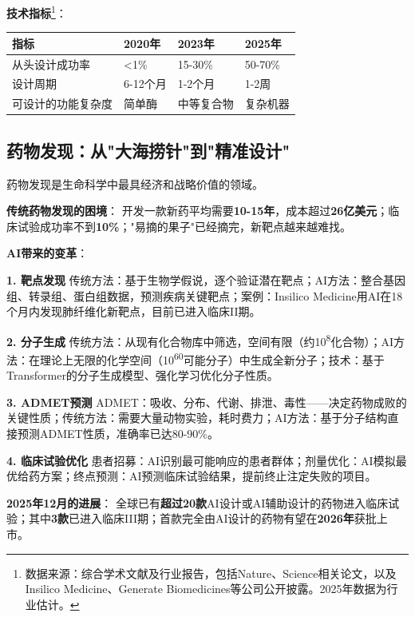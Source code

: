 \textbf{技术指标}\footnote{数据来源：综合学术文献及行业报告，包括Nature、Science相关论文，以及Insilico Medicine、Generate Biomedicines等公司公开披露。2025年数据为行业估计。}：
\begin{table}[H]
\centering
\small
\begin{tabular}{p{3.8cm}p{2.8cm}p{2.8cm}p{2.8cm}}
\toprule
\textbf{指标} & \textbf{2020年} & \textbf{2023年} & \textbf{2025年} \\
\midrule
从头设计成功率 & <1\% & 15-30\% & 50-70\% \\
设计周期 & 6-12个月 & 1-2个月 & 1-2周 \\
可设计的功能复杂度 & 简单酶 & 中等复合物 & 复杂机器 \\
\bottomrule
\end{tabular}
\end{table}

\subsection{药物发现：从"大海捞针"到"精准设计"}

药物发现是生命科学中最具经济和战略价值的领域。

\textbf{传统药物发现的困境}：
开发一款新药平均需要\textbf{10-15年}，成本超过\textbf{26亿美元}；临床试验成功率不到\textbf{10\%}；"易摘的果子"已经摘完，新靶点越来越难找。

\textbf{AI带来的变革}：

\textbf{1. 靶点发现}
传统方法：基于生物学假说，逐个验证潜在靶点；AI方法：整合基因组、转录组、蛋白组数据，预测疾病关键靶点；案例：Insilico Medicine用AI在18个月内发现肺纤维化新靶点，目前已进入临床II期。

\textbf{2. 分子生成}
传统方法：从现有化合物库中筛选，空间有限（约10\textsuperscript{8}化合物）；AI方法：在理论上无限的化学空间（10\textsuperscript{60}可能分子）中生成全新分子；技术：基于Transformer的分子生成模型、强化学习优化分子性质。

\textbf{3. ADMET预测}
ADMET：吸收、分布、代谢、排泄、毒性——决定药物成败的关键性质；传统方法：需要大量动物实验，耗时费力；AI方法：基于分子结构直接预测ADMET性质，准确率已达80-90\%。

\textbf{4. 临床试验优化}
患者招募：AI识别最可能响应的患者群体；剂量优化：AI模拟最优给药方案；终点预测：AI预测临床试验结果，提前终止注定失败的项目。

\textbf{2025年12月的进展}：
全球已有\textbf{超过20款}AI设计或AI辅助设计的药物进入临床试验；其中\textbf{3款}已进入临床III期；首款完全由AI设计的药物有望在\textbf{2026年}获批上市。

